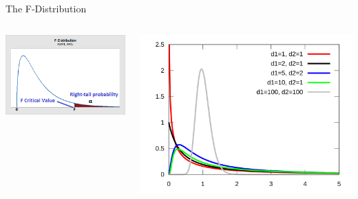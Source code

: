 \documentclass[
  ignorenonframetext,
]{beamer}
\begin{document}
\begin{frame}{The F-Distribution}
\label{the-f-distribution-1}
\begin{columns}[T]
\begin{column}{0.5\textwidth}
\includegraphics{class30_files/mediabag/f-distribution.png}
\end{column}

\begin{column}{0.5\textwidth}
\includegraphics{class30_files/mediabag/f-distribution2.png}
\end{column}
\end{columns}
\end{frame}
\end{document}

